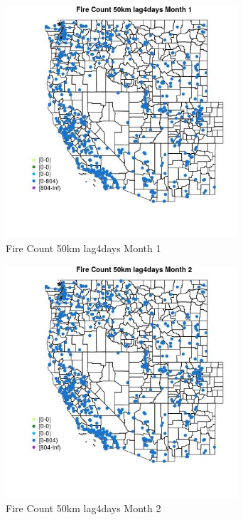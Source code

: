 \begin{figure} 
\centering  
\includegraphics[width=0.77\textwidth]{Code_Outputs/Report_ML_input_PM25_Step4_part_f_de_duplicated_aveswNAs_MapObsMo1Fire_Count_50km_lag4days.jpg} 
\caption{\label{fig:Report_ML_input_PM25_Step4_part_f_de_duplicated_aveswNAsMapObsMo1Fire_Count_50km_lag4days}Fire Count 50km lag4days Month 1} 
\end{figure} 
 

\begin{figure} 
\centering  
\includegraphics[width=0.77\textwidth]{Code_Outputs/Report_ML_input_PM25_Step4_part_f_de_duplicated_aveswNAs_MapObsMo2Fire_Count_50km_lag4days.jpg} 
\caption{\label{fig:Report_ML_input_PM25_Step4_part_f_de_duplicated_aveswNAsMapObsMo2Fire_Count_50km_lag4days}Fire Count 50km lag4days Month 2} 
\end{figure} 
 


